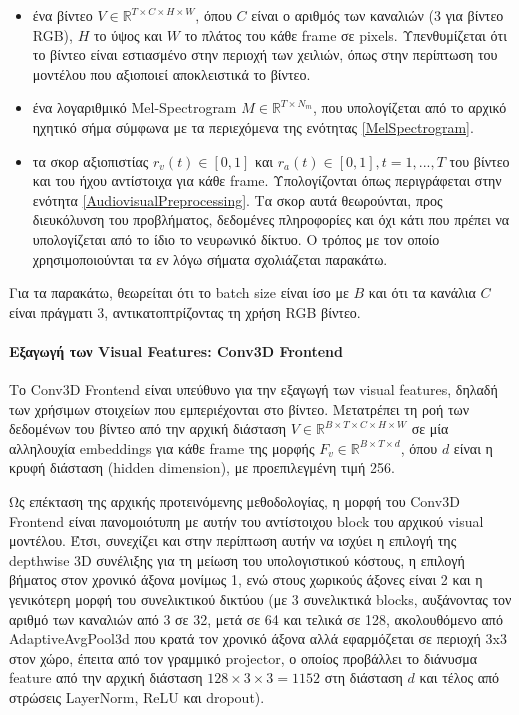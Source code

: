 \begin{itemize}
\item ένα βίντεο $V \in \mathbb{R}^{T \times C \times H \times W}$, όπου $C$ είναι ο αριθμός των καναλιών (3 για βίντεο RGB), $H$ το ύψος και $W$ το πλάτος του κάθε frame σε pixels. Υπενθυμίζεται ότι το βίντεο είναι εστιασμένο στην περιοχή των χειλιών, όπως στην περίπτωση του μοντέλου που αξιοποιεί αποκλειστικά το βίντεο.

\item ένα λογαριθμικό Mel-Spectrogram $M \in \mathbb{R}^{T \times N_m}$, που υπολογίζεται από το αρχικό ηχητικό σήμα σύμφωνα με τα περιεχόμενα της ενότητας \ref{MelSpectrogram}.

\item τα σκορ αξιοπιστίας $r_v(t) \in [0,1]$ και $r_a(t) \in [0,1], t = 1,...,T$ του βίντεο και του ήχου αντίστοιχα για κάθε frame. Υπολογίζονται όπως περιγράφεται στην ενότητα \ref{AudiovisualPreprocessing}. Τα σκορ αυτά θεωρούνται, προς διευκόλυνση του προβλήματος, δεδομένες πληροφορίες και όχι κάτι που πρέπει να υπολογίζεται από το ίδιο το νευρωνικό δίκτυο. Ο τρόπος με τον οποίο χρησιμοποιούνται τα εν λόγω σήματα σχολιάζεται παρακάτω.
\end{itemize}

Για τα παρακάτω, θεωρείται ότι το batch size είναι ίσο με $B$ και ότι τα κανάλια $C$ είναι πράγματι 3, αντικατοπτρίζοντας τη χρήση RGB βίντεο.

\paragraph{Εξαγωγή των Visual Features: Conv3D Frontend}
Το Conv3D Frontend είναι υπεύθυνο για την εξαγωγή των visual features, δηλαδή των χρήσιμων στοιχείων που εμπεριέχονται στο βίντεο. Μετατρέπει τη ροή των δεδομένων του βίντεο από την αρχική διάσταση $V \in \mathbb{R}^{B \times T \times C \times H \times W}$ σε μία αλληλουχία embeddings για κάθε frame της μορφής $F_v \in \mathbb{R}^{B \times T \times d}$, όπου $d$ είναι η κρυφή διάσταση (hidden dimension), με προεπιλεγμένη τιμή 256.

Ως επέκταση της αρχικής προτεινόμενης μεθοδολογίας, η μορφή του Conv3D Frontend είναι πανομοιότυπη με αυτήν του αντίστοιχου block του αρχικού visual μοντέλου. Έτσι, συνεχίζει και στην περίπτωση αυτήν να ισχύει η επιλογή της depthwise 3D συνέλιξης για τη μείωση του υπολογιστικού κόστους, η επιλογή βήματος στον χρονικό άξονα μονίμως 1, ενώ στους χωρικούς άξονες είναι 2 και η γενικότερη μορφή του συνελικτικού δικτύου (με 3 συνελικτικά blocks, αυξάνοντας τον αριθμό των καναλιών από 3 σε 32, μετά σε 64 και τελικά σε 128, ακολουθόμενο από AdaptiveAvgPool3d που κρατά τον χρονικό άξονα αλλά εφαρμόζεται σε περιοχή 3x3 στον χώρο, έπειτα από τον γραμμικό projector, ο οποίος προβάλλει το διάνυσμα feature από την αρχική διάσταση $128 \times 3 \times 3 = 1152$ στη διάσταση $d$ και τέλος από στρώσεις LayerNorm, ReLU και dropout). 

